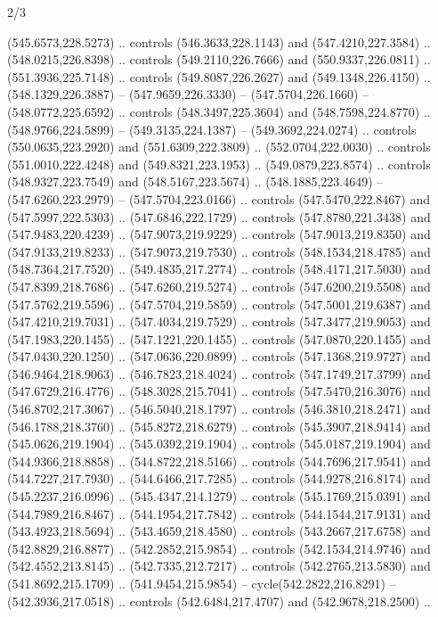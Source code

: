\begin{flagdescription}{2/3}
\begin{scope}[xshift=0.5\flaglength,yshift=0.5\flagwidth,scale=\flagwidth/495.65]
\begin{scope}[y=0.8pt, x=0.8pt, yscale=-1,shift={(-463.76,-309.78)}]
  (545.6573,228.5273) .. controls (546.3633,228.1143) and (547.4210,227.3584) ..
  (548.0215,226.8398) .. controls (549.2110,226.7666) and (550.9337,226.0811) ..
  (551.3936,225.7148) .. controls (549.8087,226.2627) and (549.1348,226.4150) ..
  (548.1329,226.3887) -- (547.9659,226.3330) -- (547.5704,226.1660) --
  (548.0772,225.6592) .. controls (548.3497,225.3604) and (548.7598,224.8770) ..
  (548.9766,224.5899) -- (549.3135,224.1387) -- (549.3692,224.0274) .. controls
  (550.0635,223.2920) and (551.6309,222.3809) .. (552.0704,222.0030) .. controls
  (551.0010,222.4248) and (549.8321,223.1953) .. (549.0879,223.8574) .. controls
  (548.9327,223.7549) and (548.5167,223.5674) .. (548.1885,223.4649) --
  (547.6260,223.2979) -- (547.5704,223.0166) .. controls (547.5470,222.8467) and
  (547.5997,222.5303) .. (547.6846,222.1729) .. controls (547.8780,221.3438) and
  (547.9483,220.4239) .. (547.9073,219.9229) .. controls (547.9013,219.8350) and
  (547.9133,219.8233) .. (547.9073,219.7530) .. controls (548.1534,218.4785) and
  (548.7364,217.7520) .. (549.4835,217.2774) .. controls (548.4171,217.5030) and
  (547.8399,218.7686) .. (547.6260,219.5274) .. controls (547.6200,219.5508) and
  (547.5762,219.5596) .. (547.5704,219.5859) .. controls (547.5001,219.6387) and
  (547.4210,219.7031) .. (547.4034,219.7529) .. controls (547.3477,219.9053) and
  (547.1983,220.1455) .. (547.1221,220.1455) .. controls (547.0870,220.1455) and
  (547.0430,220.1250) .. (547.0636,220.0899) .. controls (547.1368,219.9727) and
  (546.9464,218.9063) .. (546.7823,218.4024) .. controls (547.1749,217.3799) and
  (547.6729,216.4776) .. (548.3028,215.7041) .. controls (547.5470,216.3076) and
  (546.8702,217.3067) .. (546.5040,218.1797) .. controls (546.3810,218.2471) and
  (546.1788,218.3760) .. (545.8272,218.6279) .. controls (545.3907,218.9414) and
  (545.0626,219.1904) .. (545.0392,219.1904) .. controls (545.0187,219.1904) and
  (544.9366,218.8858) .. (544.8722,218.5166) .. controls (544.7696,217.9541) and
  (544.7227,217.7930) .. (544.6466,217.7285) .. controls (544.9278,216.8174) and
  (545.2237,216.0996) .. (545.4347,214.1279) .. controls (545.1769,215.0391) and
  (544.7989,216.8467) .. (544.1954,217.7842) .. controls (544.1544,217.9131) and
  (543.4923,218.5694) .. (543.4659,218.4580) .. controls (543.2667,217.6758) and
  (542.8829,216.8877) .. (542.2852,215.9854) .. controls (542.1534,214.9746) and
  (542.4552,213.8145) .. (542.7335,212.7217) .. controls (542.2765,213.5830) and
  (541.8692,215.1709) .. (541.9454,215.9854) -- cycle(542.2822,216.8291) --
  (542.3936,217.0518) .. controls (542.6484,217.4707) and (542.9678,218.2500) ..

\end{scope}
\end{scope}
\end{flagdescription}
